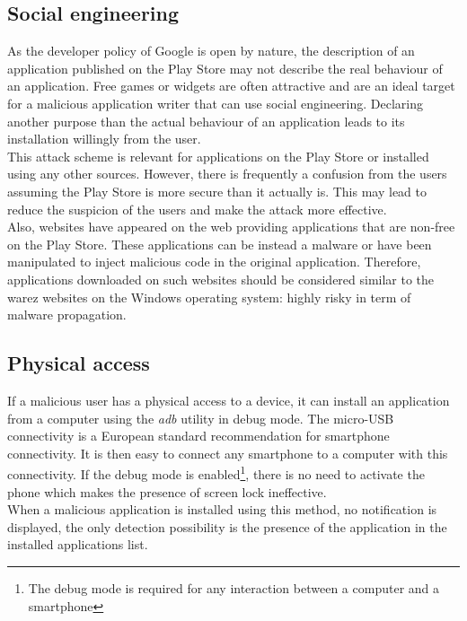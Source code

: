 \subsection{Social engineering}
\label{sec:attack-social-eng}

As the developer policy of Google is open by nature, the description of an application published on the Play Store may not describe the real behaviour of an application.
Free games or widgets are often attractive and are an ideal target for a malicious application writer that can use social engineering.
Declaring another purpose than the actual behaviour of an application leads to its installation willingly from the user.\\

This attack scheme is relevant for applications on the Play Store or installed using any other sources.
However, there is frequently a confusion from the users assuming the Play Store is more secure than it actually is.
This may lead to reduce the suspicion of the users and make the attack more effective.\\

Also, websites have appeared on the web providing applications that are non-free on the Play Store.
These applications can be instead a malware or have been manipulated to inject malicious code in the original application.
Therefore, applications downloaded on such websites should be considered similar to the warez websites on the Windows operating system: highly risky in term of malware propagation.

\subsection{Physical access}
\label{sec:attack-physic-acc}

If a malicious user has a physical access to a device, it can install an application from a computer using the \emph{adb} utility in debug mode.
The micro-USB connectivity is a European standard recommendation for smartphone connectivity.
It is then easy to connect any smartphone to a computer with this connectivity.
If the debug mode is enabled\footnote{The debug mode is required for any interaction between a computer and a smartphone}, there is no need to activate the phone which makes the presence of screen lock ineffective.\\

When a malicious application is installed using this method, no notification is displayed, the only detection possibility is the presence of the application in the installed applications list.\\

